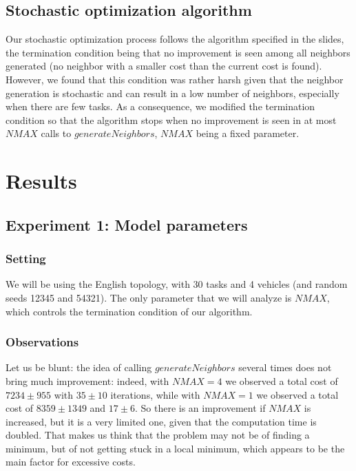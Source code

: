 \documentclass[11pt]{article}
\begin{document}
\subsection{Stochastic optimization algorithm}
Our stochastic optimization process follows the algorithm specified in the slides, the termination condition being that no improvement is seen among all neighbors generated (no neighbor with a smaller cost than the current cost is found). However, we found that this condition was rather harsh given that the neighbor generation is stochastic and can result in a low number of neighbors, especially when there are few tasks. As a consequence, we modified the termination condition so that the algorithm stops when no improvement is seen in at most $NMAX$ calls to $generateNeighbors$, $NMAX$ being a fixed parameter. 

\section{Results}

\subsection{Experiment 1: Model parameters}

\subsubsection{Setting}
We will be using the English topology, with 30 tasks and 4 vehicles (and random seeds 12345 and 54321). The only parameter that we will analyze is $NMAX$, which controls the termination condition of our algorithm.

\subsubsection{Observations}
Let us be blunt: the idea of calling $generateNeighbors$ several times does not bring much improvement: indeed, with $NMAX = 4$ we observed a total cost of $7234 \pm 955$ with $35 \pm 10$ iterations, while with $NMAX = 1$ we observed a total cost of $8359 \pm 1349$ and $17 \pm 6$. So there is an improvement if $NMAX$ is increased, but it is a very limited one, given that the computation time is doubled. That makes us think that the problem may not be of finding a minimum, but of not getting stuck in a local minimum, which appears to be the main factor for excessive costs.
\end{document}
